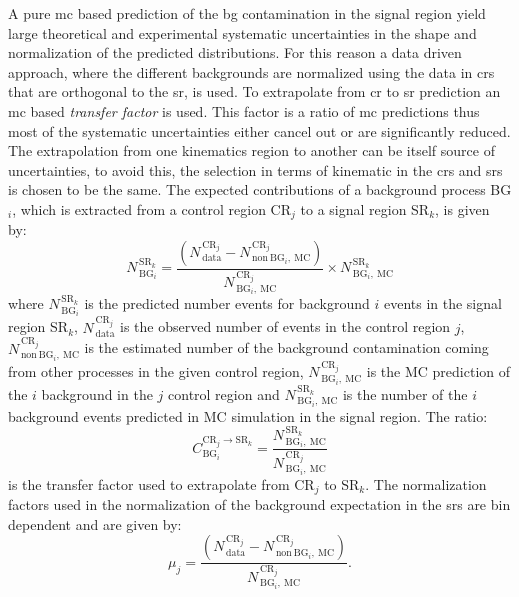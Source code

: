 A pure \gls{mc} based prediction of the \gls{bg} contamination in the signal
region yield large theoretical and experimental systematic uncertainties in the
shape and normalization of the predicted distributions. For this reason a data
driven approach, where the different backgrounds are normalized using the data
in \glspl{cr} that are orthogonal to the \gls{sr}, is used. To extrapolate from
\gls{cr} to \gls{sr} prediction an \gls{mc} based \emph{transfer factor} is
used. This factor is a ratio of \gls{mc} predictions thus most of the systematic
uncertainties either cancel out or are significantly reduced. The extrapolation
from one kinematics region to another can be itself source of uncertainties, to
avoid this, the selection in terms of kinematic in the \glspl{cr} and \glspl{sr}
is chosen to be the same. The expected contributions of a background process
BG$_i$, which is extracted from a control region CR$_j$ to a signal region
SR$_k$, is given by:
\begin{equation}
  \label{eq:100}
  N_{\mathrm{\, BG}_i}^{\mathrm{\, SR}_k} = \frac{(N_\mathrm{\,
      data}^{\mathrm{\, CR}_j} - N_{\mathrm{\,
        non~BG}_i,~\mathrm{MC}}^{\mathrm{\, CR}_j})}
  {N^{\mathrm{\, CR}_j}_{\mathrm{\, BG}_i \mathrm{,~MC}}} \times
  N^{\mathrm{\, SR}_k}_{\mathrm{\, BG}_i,~\mathrm{MC}}
\end{equation}
where $N_{\mathrm{\, BG}_i}^{\mathrm{\, SR}_k}$ is the predicted number events
for background $i$ events in the signal region SR$_k$,
$N_\mathrm{\, data}^{\mathrm{\, CR}_j}$ is the observed number of events in the
control region $j$, $N_{\mathrm{\, non~BG}_i,~\mathrm{MC}}^{\mathrm{\, CR}_j}$
is the estimated number of the background contamination coming from other
processes in the given control region,
$N^{\mathrm{\, CR}_j}_{\mathrm{\, BG}_i \mathrm{,~MC}}$ is the MC prediction of
the $i$ background in the $j$ control region and
$N^{\mathrm{\, SR}_k}_{\mathrm{\, BG}_i,~\mathrm{MC}}$ is the number of the $i$
background events predicted in MC simulation in the signal region. The ratio:
\begin{equation}
  \label{eq:101}
  C_{\mathrm{BG}_i}^{\mathrm{CR}_j \rightarrow \mathrm{SR}_k} = \frac{
    N^{\mathrm{\, SR}_k}_{\mathrm{\, BG}_i,~\mathrm{MC}}}{N^{\mathrm{\,
        CR}_j}_{\mathrm{\, BG}_i \mathrm{,~MC}}}
\end{equation}
is the transfer factor used to extrapolate from CR$_j$ to SR$_k$. The
normalization factors used in the normalization of the background expectation in
the \glspl{sr} are bin dependent and are given by:
\begin{equation}
  \label{eq:102}
  \mu_{j} = \frac{(N_\mathrm{\, data}^{\mathrm{\, CR}_j} - N_{\mathrm{\,
        non~BG}_i,~\mathrm{MC}}^{\mathrm{\, CR}_j})}{N^{\mathrm{\,
        CR}_j}_{\mathrm{\, BG}_i \mathrm{,~MC}}}.
\end{equation}
